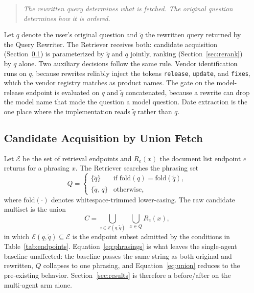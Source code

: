 \documentclass[acmsmall,review,anonymous,screen]{acmart}
\begin{document}
\begin{quote}
\emph{The rewritten query determines what is fetched. The original
question determines how it is ordered.}
\end{quote}

Let $q$ denote the user's original question and $\tilde{q}$ the
rewritten query returned by the Query Rewriter. The Retriever receives
both: candidate acquisition (Section~\ref{sec:union-fetch}) is
parameterized by $\tilde{q}$ and $q$ jointly, ranking
(Section~\ref{sec:rerank}) by $q$ alone. Two auxiliary decisions follow
the same rule. Vendor identification runs on $q$, because rewrites
reliably inject the tokens \texttt{release}, \texttt{update}, and
\texttt{fixes}, which the vendor registry matches as product names. The
gate on the model-release endpoint is evaluated on $q$ and $\tilde{q}$
concatenated, because a rewrite can drop the model name that made the
question a model question. Date extraction is the one place where the
implementation reads $\tilde{q}$ rather than $q$.

\subsection{Candidate Acquisition by Union Fetch}\label{sec:union-fetch}

Let $\mathcal{E}$ be the set of retrieval endpoints and $R_e(x)$ the
document list endpoint $e$ returns for a phrasing $x$. The Retriever
searches the phrasing set
\begin{equation}
Q =
\begin{cases}
\{\tilde{q}\} & \text{if } \mathrm{fold}(q) = \mathrm{fold}(\tilde{q}),\\
\{\tilde{q},\, q\} & \text{otherwise,}
\end{cases}
\label{eq:phrasings}
\end{equation}
where $\mathrm{fold}(\cdot)$ denotes whitespace-trimmed
lower-casing. The raw candidate multiset is the union
\begin{equation}
C = \bigcup_{e \in \mathcal{E}(q,\tilde{q})} \; \bigcup_{x \in Q} R_e(x),
\label{eq:union}
\end{equation}
in which $\mathcal{E}(q,\tilde{q}) \subseteq \mathcal{E}$ is the
endpoint subset admitted by the conditions in
Table~\ref{tab:endpoints}. Equation~\eqref{eq:phrasings} is what leaves
the single-agent baseline unaffected: the baseline passes the same
string as both original and rewritten, $Q$ collapses to one phrasing,
and Equation~\eqref{eq:union} reduces to the pre-existing
behavior. Section~\ref{sec:results} is therefore a before/after on the
multi-agent arm alone.
\end{document}
